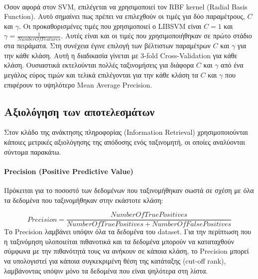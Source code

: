 \paragraph*{}
Όσον αφορά στον SVM, επιλέγεται να χρησιμοποιεί τον RBF kernel (Radial Basis Function). Αυτό σημαίνει πως πρέπει να επιλεχθούν οι τιμές για δύο παραμέτρους, $C$ και $\gamma$. Οι προκαθορισμένες τιμές που χρησιμοποιεί ο LIBSVM είναι $C = 1$ και $\gamma = \frac{1}{Number Of Features}$. Αυτές είναι και οι τιμές που χρησιμοποιήθηκαν σε πρώτο στάδιο στα πειράματα. Στη συνέχεια έγινε επιλογή των βέλτιστων παραμέτρων $C$ και $\gamma$ για την κάθε κλάση. Αυτή η διαδικασία γίνεται με 3-fold Cross-Validation για κάθε κλάση. Ουσιαστικά εκτελούνται πολλές ταξινομήσεις για διάφορα $C$ και $\gamma$  από ένα μεγάλος εύρος τιμών και τελικά επιλέγονται για την κάθε κλάση τα $C$ και $\gamma$ που επιφέρουν το υψηλότερο Mean Average Precision.


\subsection{Αξιολόγηση των αποτελεσμάτων}
Στον κλάδο της ανάκτησης πληροφορίας (Information Retrieval) χρησιμοποιούνται κάποιες μετρικές αξιολόγησης της απόδοσης ενός ταξινομητή, οι οποίες αναλύονται σύντομα παρακάτω.

\paragraph*{Precision (Positive Predictive Value)}
Πρόκειται για το ποσοστό των δεδομένων που ταξινομήθηκαν σωστά σε σχέση με όλα τα δεδομένα που ταξινομήθηκαν στην εκάστοτε κλάση:

\begin{equation}
Precision = \dfrac{Number Of True Positives}{Number Of True Positives + Number Of False Positives}
\end{equation}
Το Precision λαμβάνει υπόψιν όλα τα δεδομένα του dataset. Για την περίπτωση που η ταξινόμηση υλοποιείται πιθανοτικά και τα δεδομένα μπορούν να καταταχθούν σύμφωνα με την πιθανότητά τους να ανήκουν σε κάποια κλάση, το Precision μπορεί να υπολογιστεί για κάποια συγκεκριμένη θέση της κατάταξης (cut-off rank), λαμβάνοντας υπόψιν μόνο τα δεδομένα που είναι ψηλότερα στη λίστα.

